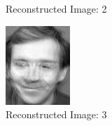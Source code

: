 \documentclass[12pt]{article}
\begin{document}
\begin{figure}
\begin{subfigure}[b]{0.20\textwidth}
		\caption{Reconstructed Image: 2}
	\end{subfigure}\quad
	\begin{subfigure}[b]{0.20\textwidth}
		\includegraphics[width=\textwidth]{Task4.3_Images/ReconstructedImage3.jpg}
		\caption{Reconstructed Image: 3}
	\end{subfigure}\\
	\begin{subfigure}[b]{0.20\textwidth}

\end{subfigure}
\end{figure}
\end{document}
